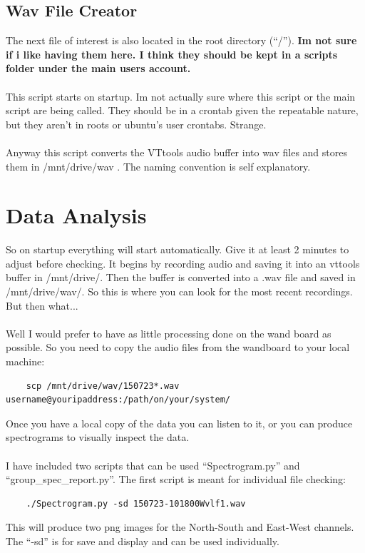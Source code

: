 \documentclass[a4paper,12pt]{article}
\begin{document}
 \subsection{Wav File Creator}
  The next file of interest is also located in the root directory (``/''). \textbf{Im not sure if i like having them here. I think they should be kept in a scripts folder under the main users account.}\\
  \\
  This script starts on startup. Im not actually sure where this script or the main script are being called. They should be in a crontab given the repeatable nature, but they aren't in roots or ubuntu's user crontabs. Strange.\\
  \\
  Anyway this script converts the VTtools audio buffer into wav files and stores them in /mnt/drive/wav . The naming convention is self explanatory.

\section{Data Analysis}
So on startup everything will start automatically. Give it at least 2 minutes to adjust before checking. It begins by recording audio and saving it into an vttools buffer in /mnt/drive/. Then the buffer is converted into a .wav file and saved in /mnt/drive/wav/. So this is where you can look for the most recent recordings. But then what...\\
\\
Well I would prefer to have as little processing done on the wand board as possible. So you need to copy the audio files from the wandboard to your local machine:
\begin{verbatim}
	scp /mnt/drive/wav/150723*.wav username@youripaddress:/path/on/your/system/
\end{verbatim}

Once you have a local copy of the data you can listen to it, or you can produce spectrograms to visually inspect the data.\\
\\
I have included two scripts that can be used ``Spectrogram.py'' and ``group\_spec\_report.py''. The first script is meant for individual file checking:

\begin{verbatim}
	./Spectrogram.py -sd 150723-101800Wvlf1.wav 
\end{verbatim}

This will produce two png images for the North-South and East-West channels. The ``-sd'' is for save and display and can be used individually. 
\end{document}
